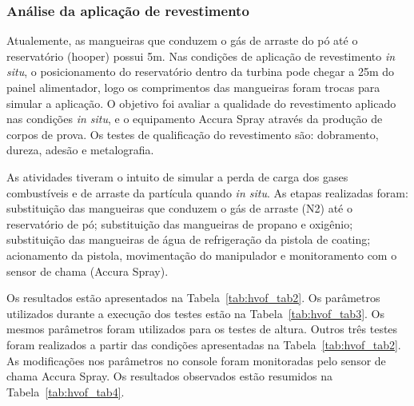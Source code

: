 \subsubsection{Análise da aplicação de revestimento}

Atualemente, as mangueiras que conduzem o gás de arraste do pó até o
reservatório (hooper) possui 5m. Nas condições de aplicação de revestimento
\textit{in situ}, o posicionamento do reservatório dentro da turbina pode chegar
a 25m do painel alimentador, logo os comprimentos das mangueiras foram trocas
para simular a aplicação. O objetivo foi avaliar a qualidade do revestimento
aplicado nas condições \textit{in situ}, e o equipamento Accura Spray através
da produção de corpos de prova. Os testes de qualificação do revestimento são:
dobramento, dureza, adesão e metalografia.

As atividades tiveram o intuito de simular a perda de carga dos gases
combustíveis e de arraste da partícula quando \textit{in situ}. As etapas
realizadas foram: substituição das mangueiras que conduzem o gás de arraste (N2)
até o reservatório de pó; substituição das mangueiras de propano e oxigênio;
substituição das mangueiras de água de refrigeração da pistola de coating;
acionamento da pistola, movimentação do manipulador e monitoramento com o sensor
de chama (Accura Spray).

Os resultados estão apresentados na Tabela~\ref{tab:hvof_tab2}. Os parâmetros
utilizados durante a execução dos testes estão na Tabela~\ref{tab:hvof_tab3}. Os
mesmos parâmetros foram utilizados para os testes de altura. Outros três testes
foram realizados a partir das condições apresentadas na
Tabela~\ref{tab:hvof_tab2}. As modificações nos parâmetros no console foram
monitoradas pelo sensor de chama Accura Spray. Os resultados observados estão
resumidos na Tabela~\ref{tab:hvof_tab4}.

